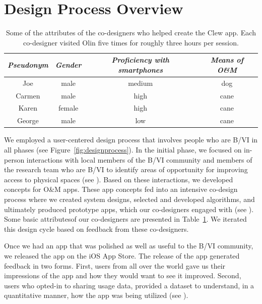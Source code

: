 \documentclass[chi]{sigchi}
\newcommand{\BVI}{B/VI\xspace}
\newcommand{\OM}{O\&M\xspace}
\begin{document}
\section{Design Process Overview}
\begin{table}
  \centering
  \begin{tabular}{c c c c}
    {\small \textit{Pseudonym}}
            & {\small \textit{Gender}} & {\small \textit{Proficiency with smartphones}} & {\small \textit{Means of \OM}} \\
    \midrule
    Joe  & male  & medium & dog \\
    Carmen  &  male & high & cane \\
   Karen  & female & high & cane\\
    George  & male & low & cane
  \end{tabular}
  \caption{Some of the attributes of the co-designers who helped create the Clew app.  Each co-designer visited Olin five times for roughly three hours per session.\label{tab:codesigners}}
\end{table}

We employed a user-centered design process that involves people who are \BVI in all phases (see Figure~\ref{fig:designprocess}).  In the initial phase, we focused on in-person interactions with local members of the \BVI community and members of the research team who are \BVI to identify areas of opportunity for improving access to physical spaces (see \emph{}).  Based on these interactions, we developed concepts for \OM apps.  These app concepts fed into an intensive co-design process where we created system designs, selected and developed algorithms, and ultimately produced prototype apps, which our co-designers engaged with (see \emph{}).  Some basic attributesof our co-designers are presented in Table~\ref{tab:codesigners}.  We iterated this design cycle based on feedback from these co-designers.

Once we had an app that was polished as well as useful to the \BVI community, we released the app on the iOS App Store.  The release of the app generated feedback in two forms.  First, users from all over the world gave us their impressions of the app and how they would want to see it improved.  Second, users who opted-in to sharing usage data, provided a dataset to understand, in a quantitative manner, how the app was being utilized (see \emph{}).
\end{document}
